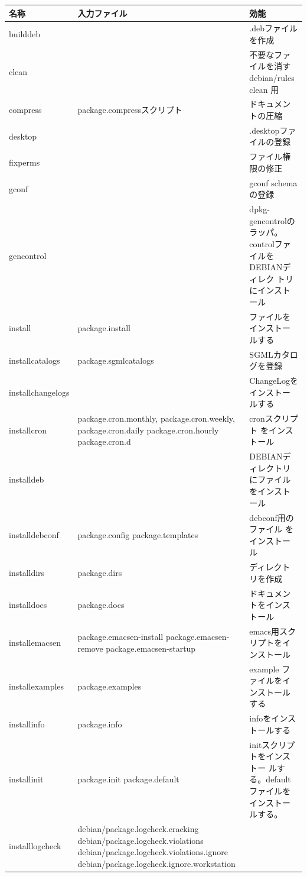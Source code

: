 \documentclass[mingoth,a4paper]{jsarticle}
\begin{document}
\begin{longtable}{|p{3cm}|p{7cm}|p{5cm}|}
\hline
\hline
名称 & 入力ファイル & 効能\\
\hline
\hline
builddeb & & .debファイルを作成 \\
\hline
clean & & 不要なファイルを消す debian/rules clean 用 \\
\hline
compress & package.compressスクリプト & ドキュメントの圧縮 \\
\hline
desktop & & .desktopファイルの登録\\
\hline
fixperms & & ファイル権限の修正\\
\hline
gconf & & gconf schemaの登録 \\
\hline
gencontrol & & dpkg-gencontrolのラッパ。 controlファイルをDEBIANディレク
 トリにインストール \\
\hline
install & package.install & ファイルをインストールする \\
\hline
installcatalogs & package.sgmlcatalogs & SGMLカタログを登録 \\
\hline
installchangelogs & & ChangeLogをインストールする \\
\hline
installcron & package.cron.monthly, package.cron.weekly,
 package.cron.daily package.cron.hourly package.cron.d  & cronスクリプト
 をインストール \\
\hline
installdeb & & DEBIANディレクトリにファイルをインストール \\
\hline
installdebconf & package.config package.templates & debconf用のファイル
 をインストール \\
\hline
installdirs & package.dirs & ディレクトリを作成 \\
\hline
installdocs & package.docs & ドキュメントをインストール \\
\hline
installemacsen & package.emacsen-install package.emacsen-remove
 package.emacsen-startup & emacs用スクリプトをインストール \\
\hline
installexamples & package.examples & example ファイルをインストールする \\
\hline
installinfo & package.info & infoをインストールする \\
\hline
installinit & package.init package.default & initスクリプトをインストー
 ルする。defaultファイルをインストールする。 \\
\hline
installlogcheck &  debian/package.logcheck.cracking
 debian/package.logcheck.violations
 debian/package.logcheck.violations.ignore
 debian/package.logcheck.ignore.workstation

\end{longtable}
\end{document}
